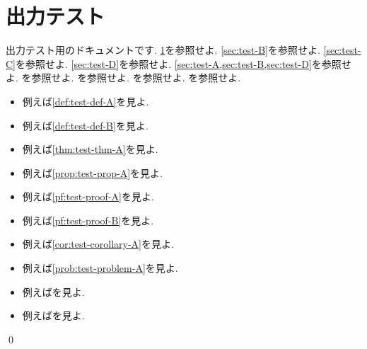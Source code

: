 \documentclass[uplatex, dvipdfmx, a4paper, 12pt, class=jsbook, crop=false]{standalone}
\begin{document}
\section{出力テスト}
\label{sec:test-A}

出力テスト用のドキュメントです.
\cref{sec:test-A}を参照せよ.
\cref{sec:test-B}を参照せよ.
\cref{sec:test-C}を参照せよ.
\cref{sec:test-D}を参照せよ.
\cref{sec:test-A,sec:test-B,sec:test-D}を参照せよ. %
\cite[Theorem~5.6.1]{Engelking1995TD}を参照せよ.
\cite[Theorem~5.6.1, Theorem~5.8.3, Proposition~5.9.10]{Engelking1995TD}を参照せよ.
\cite[132--134]{Morita1981ja}を参照せよ. %
\cite{KodamaNagami1974ja}を参照せよ.

\begin{itemize}
	\item 例えば\cref{def:test-def-A}を見よ.
	\item 例えば\cref{def:test-def-B}を見よ.
	\item 例えば\cref{thm:test-thm-A}を見よ.
	\item 例えば\cref{prop:test-prop-A}を見よ.
	\item 例えば\cref{pf:test-proof-A}を見よ.
	\item 例えば\cref{pf:test-proof-B}を見よ.
	\item 例えば\cref{cor:test-corollary-A}を見よ.
	\item 例えば\cref{prob:test-problem-A}を見よ.
	\item 例えば\cite{KodamaNagami1974ja}を見よ.
	\item 例えば\cite{Morita1981ja}を見よ.
\end{itemize}

\begin{definition}
	\label{def:test-def-A}
	\lipsum[1][1-4]
\end{definition}

\begin{definition}[テスト定義B]
	\label{def:test-def-B}
	\lipsum[1][2]
\end{definition}

\begin{theorem}[テスト定理A]
	\label{thm:test-thm-A}
	\lipsum[1][2]
\end{theorem}

\begin{corollary}
	\label{cor:test-corollary-A}
	\lipsum[1][2]
	\qed
\end{corollary}
\end{document}
